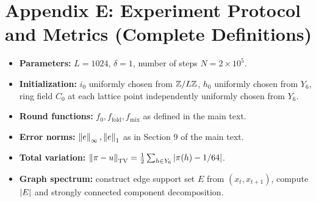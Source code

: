\section{Appendix E: Experiment Protocol and Metrics (Complete Definitions)}

\begin{itemize}
  \item \textbf{Parameters:} $L=1024$, $\delta=1$, number of steps $N=2\times 10^5$.
  \item \textbf{Initialization:} $i_0$ uniformly chosen from $\mathbb{Z}/L\mathbb{Z}$, $h_0$ uniformly chosen from $Y_6$, ring field $C_0$ at each lattice point independently uniformly chosen from $Y_6$.
  \item \textbf{Round functions:} $f_0,f_{\mathrm{fold}},f_{\mathrm{mix}}$ as defined in the main text.
  \item \textbf{Error norms:} $\left\lVert e\right\rVert_\infty,\left\lVert e\right\rVert_1$ as in Section 9 of the main text.
  \item \textbf{Total variation:} $\left\lVert \pi-u\right\rVert_{\mathrm{TV}}=\frac12\sum_{h\in Y_6}\left\lvert \pi(h)-1/64\right\rvert$.
  \item \textbf{Graph spectrum:} construct edge support set $E$ from $(x_t,x_{t+1})$, compute $\left\lvert E\right\rvert$ and strongly connected component decomposition.
\end{itemize}
